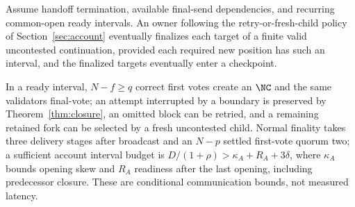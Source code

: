 \begin{theorem}
\label{thm:account-live}
Assume handoff termination, available final-send dependencies, and recurring common-open ready intervals. An owner following the retry-or-fresh-child policy of Section~\ref{sec:account} eventually finalizes each target of a finite valid uncontested continuation, provided each required new position has such an interval, and the finalized targets eventually enter a checkpoint.
\end{theorem}
In a ready interval, $N-f\ge q$ correct first votes create an $\NC$ and the same validators final-vote; an attempt interrupted by a boundary is preserved by Theorem~\ref{thm:closure}, an omitted block can be retried, and a remaining retained fork can be selected by a fresh uncontested child. Normal finality takes three delivery stages after broadcast and an $N-p$ settled first-vote quorum two; a sufficient account interval budget is $D/(1+\rho)>\kappa_A+R_A+3\delta$, where $\kappa_A$ bounds opening skew and $R_A$ readiness after the last opening, including predecessor closure. These are conditional communication bounds, not measured latency.
